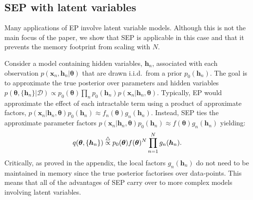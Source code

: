 
\subsection{SEP with latent variables}

Many applications of EP involve latent variable models. Although this is not the main focus of the paper, we show that SEP is applicable in this case and that it prevents the memory footprint from scaling with $N$. 

Consider a model containing hidden variables, $\bm{h}_n$, associated with each observation $p(\bm{x}_n, \bm{h}_n | \bm{\theta})$  that are drawn i.i.d.~from a prior $p_0(\bm{h}_n)$. The goal is to approximate the true posterior over parameters and hidden variables $p(\bm{\theta}, \{ \bm{h}_n\} | \mathcal{D}) \propto p_0(\bm{\theta}) \prod_n p_0(\bm{h}_n) p(\bm{x}_n | \bm{h}_n, \bm{\theta})$. 
%
Typically, EP would approximate the effect of each intractable term using a product of approximate factors, $p(\bm{x}_n | \bm{h}_n, \bm{\theta})p_0(\bm{h}_n)  \approx f_n(\bm{\theta}) g_n(\bm{h}_n) $. Instead, SEP ties the approximate parameter factors $p(\bm{x}_n | \bm{h}_n, \bm{\theta})p_0(\bm{h}_n)  \approx f(\bm{\theta}) g_n(\bm{h}_n) $ yielding:
\begin{equation}
q(\bm{\theta}, \{ \bm{h}_n\}) \buildrel\triangle\over \propto p_0(\bm{\theta}) f(\bm{\theta})^N \prod_{n=1}^N g_n(\bm{h}_n) .
\end{equation}
%
Critically, as proved in the appendix, the local factors $g_n(\bm{h}_n)$ do not need to be maintained in memory since the true posterior factorises over data-points. This means that all of the advantages of SEP carry over to more complex models involving latent variables.

%
%



